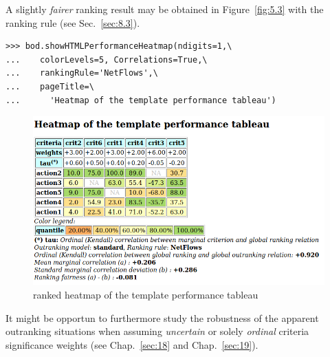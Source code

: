 A slightly \emph{fairer} ranking result may be obtained in Figure~\vref{fig:5.3} with the \NetFlows ranking rule (see Sec.~\ref{sec:8.3}).
\begin{lstlisting}
>>> bod.showHTMLPerformanceHeatmap(ndigits=1,\
...    colorLevels=5, Correlations=True,\
...    rankingRule='NetFlows',\
...    pageTitle=\
...      'Heatmap of the template performance tableau')
\end{lstlisting}
\begin{figure}[ht]
\includegraphics[width=\hsize]{Figures/5-3-templateHeatmapNF.png}
\caption{\NetFlows ranked heatmap of the template performance tableau}
\label{fig:5.3}       %
\end{figure}

It might be opportun to furthermore study the robustness of the apparent outranking situations when assuming \emph{uncertain} or solely \emph{ordinal} criteria significance weights (see Chap.~\ref{sec:18} and Chap.~\ref{sec:19}). 
 
%


